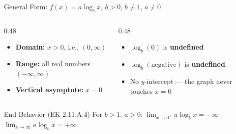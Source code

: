 \documentclass[aspectratio=169, 11pt]{beamer}
\begin{document}
\begin{frame}[t, plain]

  \begin{block}{General Form: $f(x) = a\log_b x$, \; $b > 0$, $b \ne 1$, $a \ne 0$}
  \end{block}

  \vspace{0.25cm}
  \begin{columns}[T]
    \begin{column}{0.48\textwidth}
      \begin{itemize}
        \setlength{\itemsep}{10pt}
        \item \textbf{Domain:} $x > 0$, i.e., $(0, \infty)$
        \item \textbf{Range:} all real numbers $(-\infty, \infty)$
        \item \textbf{Vertical asymptote:} $x = 0$
      \end{itemize}
    \end{column}
    \begin{column}{0.48\textwidth}
      \begin{itemize}
        \setlength{\itemsep}{10pt}
        \item $\log_b(0)$ is \textbf{undefined}
        \item $\log_b(\text{negative})$ is \textbf{undefined}
        \item No $y$-intercept --- the graph never touches $x = 0$
      \end{itemize}
    \end{column}
  \end{columns}

  \vspace{0.3cm}
  \begin{block}{End Behavior (EK 2.11.A.4)}
    For $b > 1$, $a > 0$:\quad
    $\displaystyle\lim_{x \to 0^+} a\log_b x = -\infty$
    \qquad
    $\displaystyle\lim_{x \to \infty} a\log_b x = +\infty$
  \end{block}
\end{frame}
\end{document}
